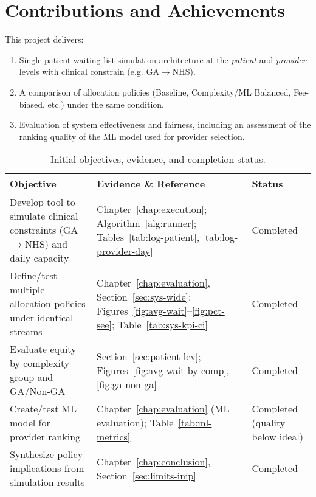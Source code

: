 \documentclass[ %
                    author={Nattanan Nawakitbamrung},
                supervisor={Dr. Sébastien Rochat},
                    degree={MSc},
                     title={Developing and Evaluating the Impact of a Single Patient Treatment List (PTL) for an NHS Integrated Care System},
                  subtitle={},
                      type={},
                      year={2025}]{dissertation}
\begin{document}
\section{Contributions and Achievements}
This project delivers:
\begin{enumerate}
    \item Single patient waiting-list simulation architecture at the \emph{patient} and \emph{provider} levels with clinical constrain (e.g. GA$\rightarrow$NHS).
    \item A comparison of allocation policies (Baseline, Complexity/ML Balanced, Fee-biased, etc.) under the same condition.
    \item Evaluation of system effectiveness and fairness, including an assessment of the ranking quality of the ML model used for provider selection. 
\end{enumerate}

\begin{table}[htbp]
\centering
\small
\renewcommand{\arraystretch}{1.15}
\begin{tabularx}{\linewidth}{@{} p{3.8cm} X p{3.2cm} @{}}
\toprule
\textbf{Objective} & \textbf{Evidence \& Reference} & \textbf{Status} \\
\midrule
Develop tool to simulate clinical constraints (GA$\rightarrow$NHS) and daily capacity
& Chapter~\ref{chap:execution}; Algorithm~\ref{alg:runner}; Tables~\ref{tab:log-patient}, \ref{tab:log-provider-day}
& Completed \\
Define/test multiple allocation policies under identical streams
& Chapter~\ref{chap:evaluation}, Section~\ref{sec:sys-wide}; Figures~\ref{fig:avg-wait}--\ref{fig:pct-see}; Table~\ref{tab:sys-kpi-ci}
& Completed \\
Evaluate equity by complexity group and GA/Non-GA
& Section~\ref{sec:patient-lev}; Figures~\ref{fig:avg-wait-by-comp}, \ref{fig:ga-non-ga}
& Completed \\
Create/test ML model for provider ranking
& Chapter~\ref{chap:evaluation} (ML evaluation); Table~\ref{tab:ml-metrics}
& Completed (quality below ideal) \\
Synthesize policy implications from simulation results
& Chapter~\ref{chap:conclusion}, Section~\ref{sec:limits-imp}
& Completed \\
\bottomrule
\end{tabularx}
\caption{Initial objectives, evidence, and completion status.}
\label{tab:aims-status}
\end{table}
\end{document}

